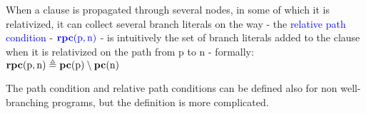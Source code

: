 When a clause is propagated through several nodes, in some of which it is relativized, it can collect several branch literals on the way - the \textcolor{blue}{relative path condition} - $\textcolor{blue}{\mathbf{rpc}(\mathrm{p},\mathrm{n})}$ - is intuitively the set of branch literals added to the clause when it is relativized on the path from p to n - formally:\\
$\mathbf{rpc}(\mathrm{p},\mathrm{n}) \triangleq \mathbf{pc}(\mathrm{p}) \setminus \mathbf{pc}(\mathrm{n})$

The path condition and relative path conditions can be defined also for non well-branching programs, but the definition is more complicated.




%
